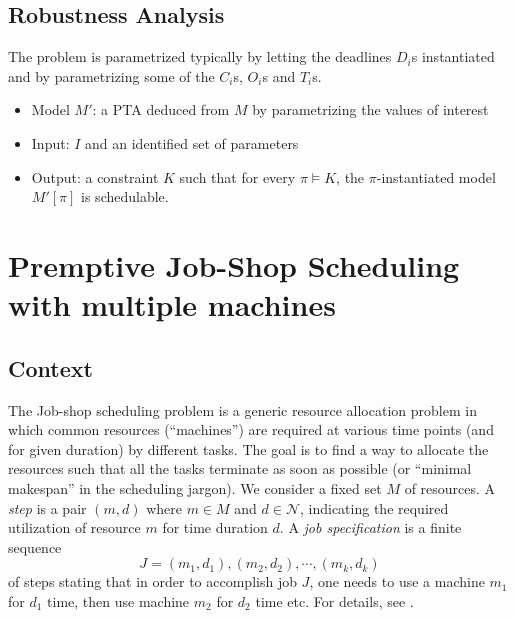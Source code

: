 \documentclass{article}
\begin{document}
\subsection{Robustness Analysis}


The problem is parametrized typically by letting the deadlines $D_i$s instantiated and by parametrizing some of the $C_i$s, $O_i$s and $T_i$s.
\begin{itemize}
 \item Model $M'$: a PTA deduced from $M$ by parametrizing the values of interest 
 \item Input: $I$ and an identified set of parameters
 \item Output: a constraint $K$ such that for every $\pi \models K$, the $\pi$-instantiated model $M'[\pi]$ is schedulable.
\end{itemize}


\section{Premptive Job-Shop Scheduling with multiple machines \cite{am02}}
\label{sec:am02}
\subsection{Context}
The Job-shop scheduling problem is a generic resource allocation problem in which common
resources (``machines'') are required at various time points (and for given duration) by different tasks. The goal is to find a way to allocate the resources such that all the tasks terminate
as soon as possible (or ``minimal makespan'' in the scheduling jargon). We consider a fixed set $M$ of resources. A \emph{step} is a pair $(m,d)$ where $m \in M$ and $d \in \mathcal{N}$, indicating 
the required utilization of resource $m$ for time duration $d$. A \emph{job specification} is a finite sequence
$$J = (m_1,d_1),(m_2,d_2),\cdots, (m_k,d_k)$$ of steps stating that in order to accomplish job $J$, one needs to use a machine $m_1$ for $d_1$ time, then use machine $m_2$ for $d_2$ time etc. For details, see \cite{am02}.
% 
\end{document}
